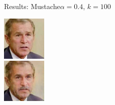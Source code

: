 \documentclass[11pt]{beamer}
\begin{document}
\begin{frame}{Results: Mustache}{$\alpha=0.4$, $k=100$}
\begin{minipage}{81px}
	\end{minipage}%
	\begin{minipage}{81px}
		\includegraphics[width=80px]{../pictures/outputs/start-imgs/Bush.png}\\
		\includegraphics[width=80px]{../pictures/outputs/mustache_alpha0.4_k100/Bush.png}
	\end{minipage}
\end{frame}

\end{document}
